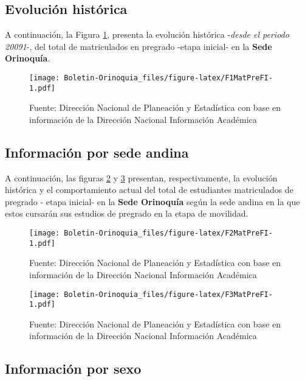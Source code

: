 \documentclass[
]{book}
\begin{document}
\hypertarget{evoluciuxf3n-histuxf3rica-3}{%
\subsection{Evolución histórica}\label{evoluciuxf3n-histuxf3rica-3}}

A continuación, la Figura \ref{fig:F1MatPreFI}, presenta la evolución histórica -\emph{desde el periodo 20091}-, del total de matriculados en pregrado -etapa inicial- en la \textbf{Sede Orinoquía}.

\begin{figure}
\centering
\texttt{[image: Boletin-Orinoquia\_files/figure-latex/F1MatPreFI-1.pdf]}
\caption{\label{fig:F1MatPreFI}Fuente: Dirección Nacional de Planeación y Estadística con base en información de la Dirección Nacional Información Académica}
\end{figure}

\hypertarget{informaciuxf3n-por-sede-andina-1}{%
\subsection{Información por sede andina}\label{informaciuxf3n-por-sede-andina-1}}

A continuación, las figuras \ref{fig:F2MatPreFI} y \ref{fig:F3MatPreFI} presentan, respectivamente, la evolución histórica y el comportamiento actual del total de estudiantes matriculados de pregrado - etapa inicial- en la \textbf{Sede Orinoquía} según la sede andina en la que estos cursarán sus estudios de pregrado en la etapa de movilidad.

\begin{figure}
\centering
\texttt{[image: Boletin-Orinoquia\_files/figure-latex/F2MatPreFI-1.pdf]}
\caption{\label{fig:F2MatPreFI}Fuente: Dirección Nacional de Planeación y Estadística con base en información de la Dirección Nacional Información Académica}
\end{figure}

\begin{figure}
\centering
\texttt{[image: Boletin-Orinoquia\_files/figure-latex/F3MatPreFI-1.pdf]}
\caption{\label{fig:F3MatPreFI}Fuente: Dirección Nacional de Planeación y Estadística con base en información de la Dirección Nacional Información Académica}
\end{figure}

\hypertarget{informaciuxf3n-por-sexo-3}{%
\subsection{Información por sexo}\label{informaciuxf3n-por-sexo-3}}
\end{document}
